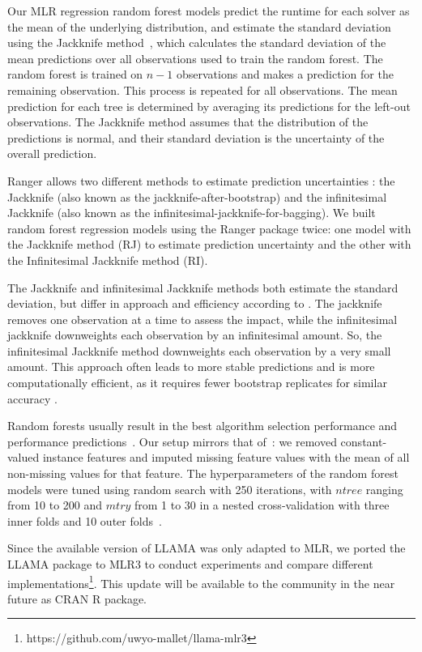 Our MLR regression random forest models predict the runtime for each solver as the mean of the underlying distribution, and estimate the standard deviation using the Jackknife method~\cite{wager2014confidence,mlr}, which calculates the standard deviation of the mean predictions over all observations used to train the random forest. The random forest is trained on $n-1$ observations and makes a prediction for the remaining observation. This process is repeated for all observations. The mean prediction for each tree is determined by averaging its predictions for the left-out observations. The Jackknife method assumes that the distribution of the predictions is normal, and their standard deviation is the uncertainty of the overall prediction.

Ranger allows two different methods to estimate prediction uncertainties \cite{wager2014confidence}: the Jackknife (also known as the jackknife-after-bootstrap) and the infinitesimal Jackknife (also known as the infinitesimal-jackknife-for-bagging). We built random forest regression models using the Ranger package twice: one model with the Jackknife method (RJ) to estimate prediction uncertainty and the other with the Infinitesimal Jackknife method (RI).

The Jackknife and infinitesimal Jackknife methods both estimate the standard deviation, but differ in approach and efficiency according to \cite{wager2014confidence}. The jackknife removes one observation at a time to assess the impact, while the infinitesimal jackknife downweights each observation by an infinitesimal amount. So, the infinitesimal Jackknife method downweights each observation by a very small amount. This approach often leads to more stable predictions and is more computationally efficient, as it requires fewer bootstrap replicates for similar accuracy \cite{wager2014confidence}.

Random forests usually result in the best algorithm selection performance and performance predictions~\cite{BISCHL201641,HUTTER201479}.
Our setup mirrors that of~\cite{BISCHL201641}:  we removed constant-valued instance features and imputed missing feature values with the mean of all non-missing values for that feature. The
hyperparameters of the random forest models were tuned using random search with 250 iterations, with $ntree$ ranging from 10 to 200 and $mtry$ from 1 to 30 in a nested cross-validation with three
inner folds and 10 outer folds~\cite{BISCHL201641}.

Since the available version of LLAMA \cite{LLAMA} was only adapted to MLR, we ported the LLAMA package to MLR3 to conduct experiments and compare different implementations\footnote{https://github.com/uwyo-mallet/llama-mlr3}. This update will be available to the community in the near future as CRAN R package. 

